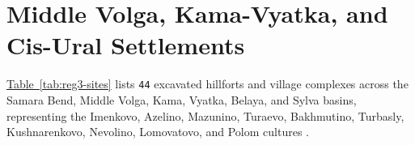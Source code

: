 \documentclass[10pt,onecolumn]{intellte}
\providecommand{\crdxref}[2]{\hyperref[#2]{#1~\ref*{#2}}}
\begin{document}
\section{Middle Volga, Kama-Vyatka, and Cis-Ural
Settlements}\label{middle-volga-kama-vyatka-and-cis-ural-settlements}

\crdxref{Table}{tab:reg3-sites} lists \texttt{44} excavated hillforts
and village complexes across the Samara Bend, Middle Volga, Kama,
Vyatka, Belaya, and Sylva basins, representing the Imenkovo, Azelino,
Mazunino, Turaevo, Bakhmutino, Turbasly, Kushnarenkovo, Nevolino,
Lomovatovo, and Polom cultures
.
\end{document}
